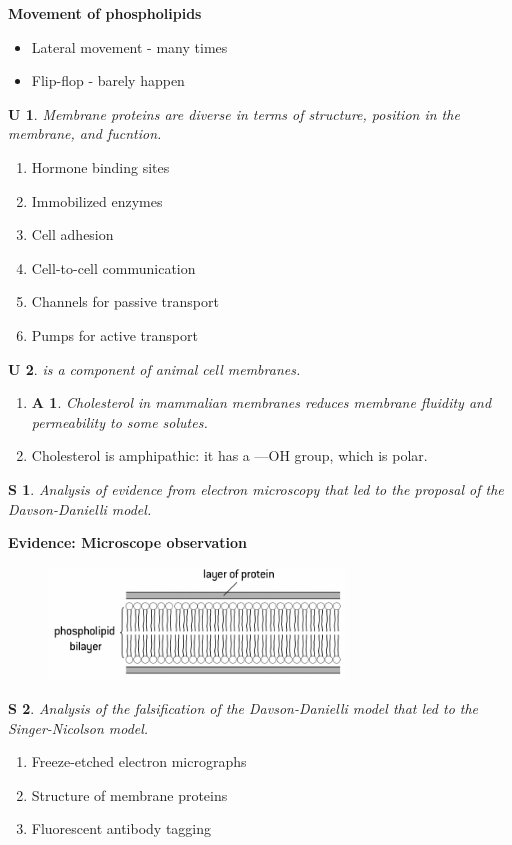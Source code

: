 \documentclass[12pt, a4paper]{article}
\newtheorem{und}{U}[subsection]
\newtheorem{skl}{S}[subsection]
\newtheorem{app}{A}[subsection]
\begin{document}
\textbf{Movement of phospholipids}
\begin{itemize}
    \item Lateral movement - many times
    \item Flip-flop - barely happen
\end{itemize}
\begin{und}
    Membrane proteins are diverse in terms of structure, position in the membrane, and fucntion. 
\end{und}
\begin{enumerate}
    \item Hormone binding sites
    \item Immobilized enzymes
    \item Cell adhesion
    \item Cell-to-cell communication
    \item Channels for passive transport
    \item Pumps for active transport
\end{enumerate}
\begin{und}
    \textbf{\color{red}{Cholesterol}} is a component of animal cell membranes. 
\end{und}
\begin{enumerate}
    \item \begin{app} Cholesterol in mammalian membranes reduces membrane fluidity and permeability to some solutes. \end{app}
    \item Cholesterol is amphipathic: it has a ---OH group, which is polar. 
\end{enumerate}
\begin{skl}
    Analysis of evidence from electron microscopy that led to the proposal of the Davson-Danielli model.
\end{skl}
\textbf{Evidence: Microscope observation}
\begin{figure}[H]
    \center
    \includegraphics[width=0.7\textwidth]{Fig1.7.png}
\end{figure}
\begin{skl}
    Analysis of the falsification of the Davson-Danielli model that led to the Singer-Nicolson model.
\end{skl}
\begin{enumerate}
    \item Freeze-etched electron micrographs
    \item Structure of membrane proteins
    \item Fluorescent antibody tagging
\end{enumerate}
\end{document}
